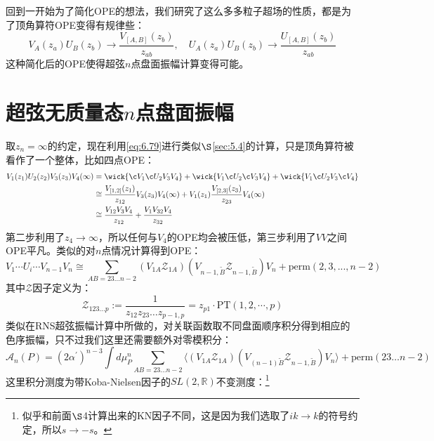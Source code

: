 回到一开始为了简化OPE的想法，我们研究了这么多多粒子超场的性质，都是为了顶角算符OPE变得有规律些：
\begin{equation}
	\label{eq:6.79}
	V_A(z_a)U_B(z_b)\to\frac{V_{[A,B]}(z_b)}{z_{ab}},\quad U_A(z_a)U_B(z_b)\to\frac{U_{[A,B]}(z_b)}{z_{ab}}
\end{equation}
这种简化后的OPE使得超弦$n$点盘面振幅计算变得可能。

\section{超弦无质量态$n$点盘面振幅}
取$z_n=\infty$的约定，现在利用\ref{eq:6.79}进行类似$\S$\ref{sec:5.4}的计算，只是顶角算符被看作了一个整体，比如四点OPE：
\begin{equation}
	\label{eq:6.80}
	\begin{aligned}
		V_1(z_1)U_2(z_2)V_3(z_3)V_4(\infty)&=\wick{\c V_1\c U_2V_3V_4}+\wick{ V_1\c U_2\c V_3V_4}+\wick{V_1\c U_2V_3\c V_4}\\
		&\cong\frac{V_{[1,2]}(z_1)}{z_{12}}V_3(z_3)V_4(\infty)+V_1(z_1)\frac{V_{[2,3]}(z_3)}{z_{23}}V_4(\infty)\\&\cong\frac{V_{12}V_3V_4}{z_{12}}+\frac{V_1V_{32}V_4}{z_{32}}
	\end{aligned}
\end{equation}
第二步利用了$z_4\to\infty$，所以任何与$V_4$的OPE均会被压低，第三步利用了$VV$之间OPE平凡。类似的对$n$点情况计算得到OPE：
\begin{equation}
	V_1\cdots U_i\cdots V_{n-1}V_n\cong\sum_{AB=23...n-2}(V_{1A}\mathcal{Z}_{1A})(V_{n-1,\tilde{B}}\mathcal{Z}_{n-1,\tilde{B}})V_n+\mathrm{perm}(2,3,...,n-2)
\end{equation}
其中$\mathcal{Z}$因子定义为：
\begin{equation}
	\label{PT}
	\mathcal{Z}_{123...p}:=\frac{1}{z_{12}z_{23}\ldots z_{p-1,p}}=z_{p1}\cdot\mathrm{PT}(1,2,\cdots,p)
\end{equation}
类似在RNS超弦振幅计算中所做的，对关联函数取不同盘面顺序积分得到相应的色序振幅，只不过我们这里还需要额外对零模积分：
\begin{equation}
	\label{eq:6.85}
\boxed{
		\mathcal{A}_n(P)=(2\alpha^{\prime})^{n-3}\int d\mu_P^n\sum_{AB=23...n-2}\langle\left(V_{1A}\mathcal{Z}_{1A}\right)(V_{(n-1)\tilde{B}}\mathcal{Z}_{n-1,\tilde{B}})V_n\rangle+\mathrm{perm}(23\ldots n-2)
}
\end{equation}
这里积分测度为带Koba-Nielsen因子的$SL(2,\mathbb{R})$不变测度：\footnote{似乎和前面$\S$4计算出来的KN因子不同，这是因为我们选取了$ik\to k$的符号约定，所以$s\to -s$。}
